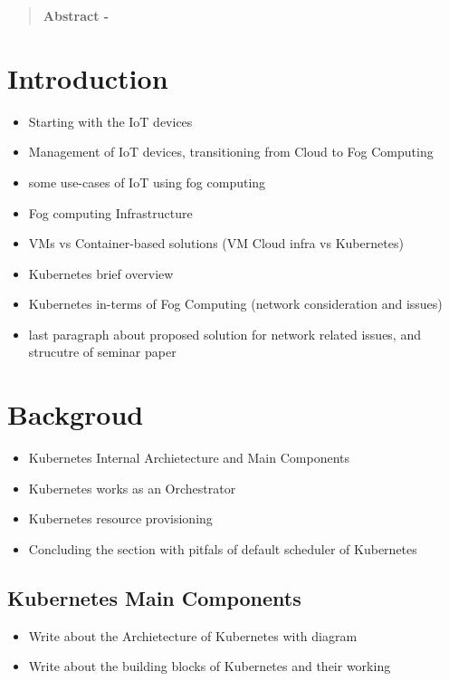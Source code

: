 %
%


\begin{abstract}
\textbf{Abstract - }
\end{abstract}


\section{Introduction}
\label{sec:introduction}
\begin{itemize}
  \item Starting with the IoT devices
  \item Management of IoT devices, transitioning from Cloud to Fog Computing
  \item some use-cases of IoT using fog computing
  \item Fog computing Infrastructure
  \item VMs vs Container-based solutions (VM Cloud infra vs Kubernetes)
  \item Kubernetes brief overview
  \item Kubernetes in-terms of Fog Computing (network consideration and issues)
  \item last paragraph about proposed solution for network related issues, and strucutre of seminar paper
\end{itemize}

\section{Backgroud}
\label{sec:backgroud}
\begin{itemize}
  \item Kubernetes Internal Archietecture and Main Components
  \item Kubernetes works as an Orchestrator
  \item Kubernetes resource provisioning
  \item Concluding the section with pitfals of default scheduler of Kubernetes
\end{itemize}

\subsection{Kubernetes Main Components}
\label{sec:k8s_main_comp}
\begin{itemize}
  \item Write about the Archietecture of Kubernetes with diagram
  \item Write about the building blocks of Kubernetes and their working
\end{itemize}

